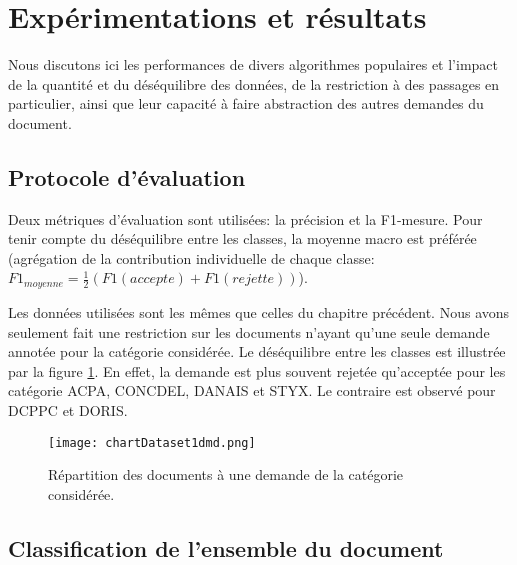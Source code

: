 
\section{Expérimentations et résultats}
\label{sec:sensresultat:experimentations}
Nous discutons ici les performances de divers algorithmes populaires et l'impact de la quantité et du déséquilibre des données, de la restriction à des passages en particulier, ainsi que leur capacité à faire abstraction des autres demandes du document. 

\subsection{Protocole d'évaluation}
Deux métriques d'évaluation sont utilisées: la précision et la F1-mesure. Pour tenir compte du déséquilibre entre les classes, la moyenne macro est préférée (agrégation de la contribution individuelle de chaque classe: $F1_{moyenne} = \frac{1}{2}(F1({accepte}) + F1({rejette}))$).

Les données utilisées sont les mêmes que celles du chapitre précédent. Nous avons seulement fait une restriction sur les documents n'ayant qu'une seule demande annotée pour la catégorie considérée. Le déséquilibre entre les classes est illustrée par la figure \ref{fig:sensresultat:stat-1dmd}. En effet, la demande est plus souvent rejetée qu'acceptée pour les catégorie ACPA, CONCDEL, DANAIS et STYX. Le contraire est observé pour DCPPC et DORIS.
\begin{figure}[htb]
\texttt{[image: chartDataset1dmd.png]}
\caption{Répartition des documents à une demande de la catégorie considérée.}\label{fig:sensresultat:stat-1dmd}
\end{figure}

\subsection{Classification de l'ensemble du document}

